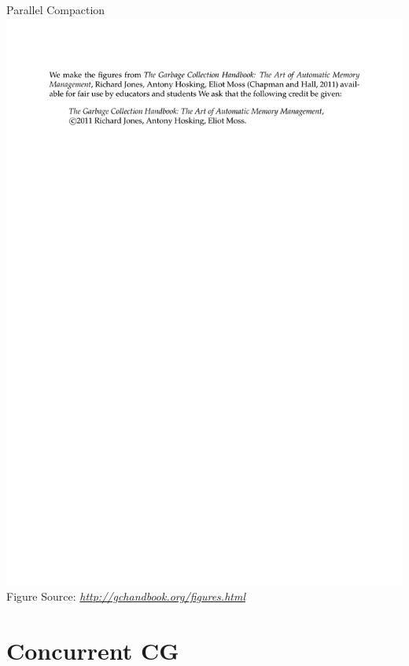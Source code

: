 \documentclass[
14pt,
aspectratio=169,
usenames,
dvipsnames,
x11names]{beamer}
\newcommand{\src}[1]{\scriptsize Figure Source: \textit{#1}}
\begin{document}
\begin{frame}{Parallel Compaction}
  \centering
  \includegraphics[page=73,trim=4cm 9.5cm 4cm 10.5cm,height=.7\textheight]{gchandbookfigures}\\
  \src{\url{http://gchandbook.org/figures.html}}
\end{frame}

\section{Concurrent CG}
\end{document}
